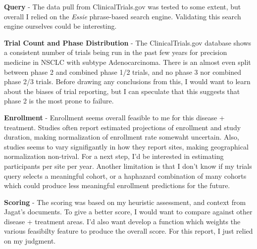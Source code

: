 \documentclass[11pt, letterpaper]{article}
\begin{document}

\textbf{Query} - The data pull from ClinicalTrials.gov was tested to some extent, but overall I relied 
on the \textit{Essie} phrase-based search engine. Validating this search engine ourselves 
could be interesting.

\textbf{Trial Count and Phase Distribution} - The ClinicalTrials.gov database shows a consistent number of 
trials being run in the past few years 
for precision medicine in NSCLC with subtype Adenocarcinoma. There is an almost even split between 
phase 2 and combined phase 1/2 trials, and no phase 3 nor combined phase 2/3 trials. Before drawing 
any conclusions from this, I would want to learn about the biases of trial reporting, but I can 
speculate that this suggests that phase 2 is the most prone to failure.

\textbf{Enrollment} - Enrollment seems overall feasible to me for this disease + treatment. Studies often report estimated projections 
of enrollment and study duration, making normalization of enrollment rate somewaht uncertain. Also, studies 
seems to vary signifigantly in how they report sites, making geographical normalization non-trival. For a next 
step, I'd be interested in estimating participants per site per year. Another limitation is that I don't know if 
my trials query selects a meaningful cohort, or a haphazard combination of many cohorts which could produce less meaningful 
enrollment predictions for the future.


\textbf{Scoring} - The scoring was based on my heuristic assessment, and context from Jagat's documents. To give a better score, 
I would want to compare against other disease + treatment areas. I'd also want develop a function which weights the 
various feasibilty feature to produce the overall score. For this report, I just relied on my judgment.
\end{document}
